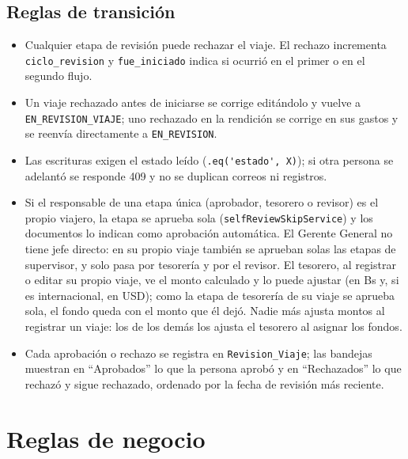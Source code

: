 \documentclass[11pt,letterpaper]{article}
\newcommand{\code}[1]{\nolinkurl{#1}}
\begin{document}
\subsection{Reglas de transición}
\begin{itemize}
  \item Cualquier etapa de revisión puede rechazar el viaje. El rechazo incrementa \code{ciclo_revision} y \code{fue_iniciado} indica si ocurrió en el primer o en el segundo flujo.
  \item Un viaje rechazado antes de iniciarse se corrige editándolo y vuelve a \code{EN_REVISION_VIAJE}; uno rechazado en la rendición se corrige en sus gastos y se reenvía directamente a \code{EN_REVISION}.
  \item Las escrituras exigen el estado leído (\code{.eq('estado', X)}); si otra persona se adelantó se responde 409 y no se duplican correos ni registros.
  \item Si el responsable de una etapa única (aprobador, tesorero o revisor) es el propio viajero, la etapa se aprueba sola (\code{selfReviewSkipService}) y los documentos lo indican como aprobación automática. El Gerente General no tiene jefe directo: en su propio viaje también se aprueban solas las etapas de supervisor, y solo pasa por tesorería y por el revisor. El tesorero, al registrar o editar su propio viaje, ve el monto calculado y lo puede ajustar (en Bs y, si es internacional, en USD); como la etapa de tesorería de su viaje se aprueba sola, el fondo queda con el monto que él dejó. Nadie más ajusta montos al registrar un viaje: los de los demás los ajusta el tesorero al asignar los fondos.
  \item Cada aprobación o rechazo se registra en \code{Revision_Viaje}; las bandejas muestran en ``Aprobados'' lo que la persona aprobó y en ``Rechazados'' lo que rechazó y sigue rechazado, ordenado por la fecha de revisión más reciente.
\end{itemize}

\section{Reglas de negocio}
\end{document}
